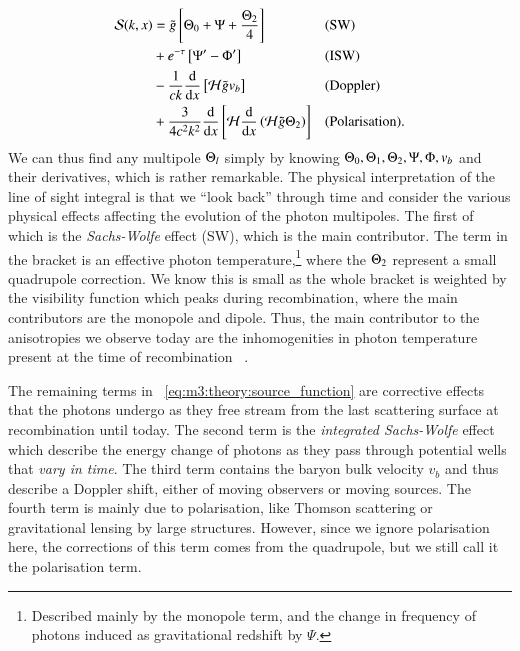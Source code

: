     \begin{equation}\label{eq:m3:theory:source_function}
        \begin{split}
            \mathcal{S}(k,x) &= \tilde{g}\left[\Theta_0+\Psi+\frac{\Theta_2}{4}\right] && \text{(SW)}\\
            &+ e^{-\tau}\left[\Psi'-\Phi'\right] &&\text{(ISW)}\\
            &-\frac{1}{ck}\dv{}{x}\left[\mathcal{H}\tilde{g}v_b\right] && \text{(Doppler)} \\
            &+ \frac{3}{4c^2k^2}\dv{}{x}\left[\mathcal{H}\dv{}{x}\left(\mathcal{H}\tilde{g}\Theta_2\right)\right] && \text{(Polarisation)}.
        \end{split}
    \end{equation}
    We can thus find any multipole $\Theta_l$ simply by knowing $\Theta_0, \Theta_1, \Theta_2, \Psi, \Phi, v_b$ and their derivatives, which is rather remarkable. The physical interpretation of the line of sight integral is that we ``look back'' through time and consider the various physical effects affecting the evolution of the photon multipoles. The first of which is the \textit{Sachs-Wolfe} effect (SW), which is the main contributor. The term in the bracket is an effective photon temperature,\footnote{Described mainly by the monopole term, and the change in frequency of photons induced as gravitational redshift by $\Psi$.} where the $\Theta_2$ represent a small quadrupole correction. We know this is small as the whole bracket is weighted by the visibility function which peaks during recombination, where the main contributors are the monopole and dipole. Thus, the main contributor to the anisotropies we observe today are the inhomogenities in photon temperature present at the time of recombination ~\cite{AST5220LectureNotes}. 

    The remaining terms in ~\cref{eq:m3:theory:source_function} are corrective effects that the photons undergo as they free stream from the last scattering surface at recombination until today. The second term is the \textit{integrated Sachs-Wolfe} effect which describe the energy change of photons as they pass through potential wells that \textit{vary in time}. The third term contains the baryon bulk velocity $v_b$ and thus describe a Doppler shift, either of moving observers or moving sources. The fourth term is mainly due to polarisation, like Thomson scattering or gravitational lensing by large structures. However, since we ignore polarisation here, the corrections of this term comes from the quadrupole, but we still call it the polarisation term. 



